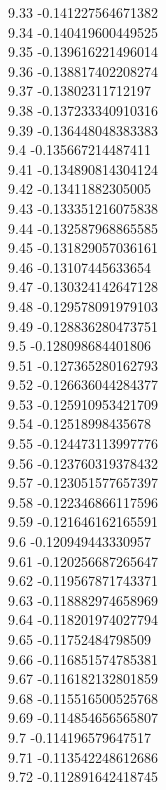 {9.33	-0.141227564671382\\
9.34	-0.140419600449525\\
9.35	-0.139616221496014\\
9.36	-0.138817402208274\\
9.37	-0.13802311712197\\
9.38	-0.137233340910316\\
9.39	-0.136448048383383\\
9.4	-0.135667214487411\\
9.41	-0.134890814304124\\
9.42	-0.13411882305005\\
9.43	-0.133351216075838\\
9.44	-0.132587968865585\\
9.45	-0.131829057036161\\
9.46	-0.13107445633654\\
9.47	-0.130324142647128\\
9.48	-0.129578091979103\\
9.49	-0.128836280473751\\
9.5	-0.128098684401806\\
9.51	-0.127365280162793\\
9.52	-0.126636044284377\\
9.53	-0.125910953421709\\
9.54	-0.12518998435678\\
9.55	-0.124473113997776\\
9.56	-0.123760319378432\\
9.57	-0.123051577657397\\
9.58	-0.122346866117596\\
9.59	-0.121646162165591\\
9.6	-0.120949443330957\\
9.61	-0.120256687265647\\
9.62	-0.119567871743371\\
9.63	-0.118882974658969\\
9.64	-0.118201974027794\\
9.65	-0.11752484798509\\
9.66	-0.116851574785381\\
9.67	-0.116182132801859\\
9.68	-0.115516500525768\\
9.69	-0.114854656565807\\
9.7	-0.114196579647517\\
9.71	-0.113542248612686\\
9.72	-0.112891642418745\\
}
